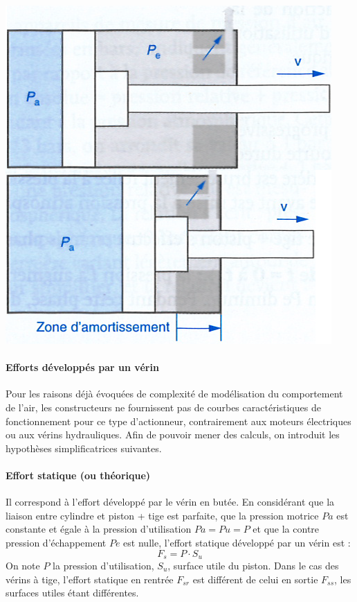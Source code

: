 \documentclass[10pt]{article}
\begin{document}
\begin{minipage}[c]{.35\linewidth}
\begin{center}
\includegraphics[width=\textwidth]{images/fig3}
\end{center}
\end{minipage}

\paragraph{Efforts développés par un vérin}
Pour les raisons déjà évoquées de complexité de modélisation du comportement de l'air, les constructeurs ne fournissent pas de courbes caractéristiques de fonctionnement pour ce type d'actionneur, contrairement aux moteurs électriques ou aux vérins hydrauliques. Afin de pouvoir mener des calculs, on introduit les hypothèses simplificatrices suivantes. 

\paragraph{Effort statique (ou théorique)}
Il correspond à l'effort développé par le vérin en butée. En considérant que la liaison entre cylindre et piston + tige est parfaite, que la pression motrice $Pa$ est constante et égale à la pression d'utilisation $Pa=Pu=P$ et que la contre pression d'échappement $Pe$ est nulle, l'effort statique développé par un vérin est :
$$
F_s=P\cdot S_u
$$
On note $P$ la pression d'utilisation, $S_u$, surface utile du piston. Dans le cas des vérins à tige, l'effort statique en rentrée $F_{sr}$ est différent de celui en sortie $F_{ss}$, les surfaces utiles étant différentes. 
\end{document}
